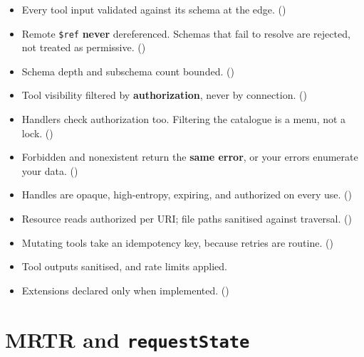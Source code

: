 \begin{itemize}[leftmargin=1.6em, itemsep=3pt]
\item[$\square$] Every tool input validated against its schema at the edge.
()
\item[$\square$] Remote \texttt{\$ref} \textbf{never} dereferenced. Schemas that
fail to resolve are rejected, not treated as permissive. ()
\item[$\square$] Schema depth and subschema count bounded. ()
\item[$\square$] Tool visibility filtered by \textbf{authorization}, never by
connection. ()
\item[$\square$] Handlers check authorization too. Filtering the catalogue is a
menu, not a lock. ()
\item[$\square$] Forbidden and nonexistent return the \textbf{same error}, or
your errors enumerate your data. ()
\item[$\square$] Handles are opaque, high-entropy, expiring, and authorized on
every use. ()
\item[$\square$] Resource reads authorized per URI; file paths sanitised against
traversal. ()
\item[$\square$] Mutating tools take an idempotency key, because retries are
routine. ()
\item[$\square$] Tool outputs sanitised, and rate limits applied.
\item[$\square$] Extensions declared only when implemented.
()
\end{itemize}

\section{MRTR and \texttt{requestState}}

